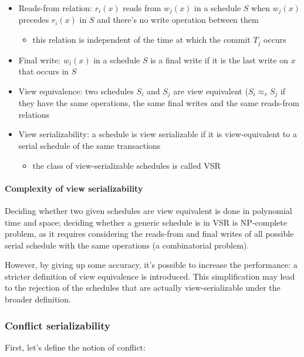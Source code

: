 \documentclass[english]{article}
\begin{document}
\begin{itemize}
  \item Reads-from relation: \(r_i(x)\) reads from \(w_j(x)\) in a schedule \(S\) when \(w_j(x)\) precedes \(r_i(x)\) in \(S\) and there's no write operation between them
        \begin{itemize}
          \item this relation is independent of the time at which the commit \(T_j\) occurs
        \end{itemize}
  \item Final write: \(w_i(x)\) in a schedule \(S\) is a final write if it is the last write on \(x\) that occurs in \(S\)
  \item View equivalence: two schedules \(S_i\) and \(S_j\) are view equivalent (\(S_i \approx_v S_j\) if they have the same operations, the same final writes and the same reads-from relations
  \item View serializability: a schedule is view serializable if it is view-equivalent to a serial schedule of the same transactions
        \begin{itemize}
          \item the class of view-serializable schedules is called VSR
        \end{itemize}
\end{itemize}

\paragraph{Complexity of view serializability}

Deciding whether two given schedules are view equivalent is done in polynomial time and space;
deciding whether a generic schedule is in VSR is NP-complete problem, as it requires considering the reads-from and final writes of all possible serial schedule with the same operations (a combinatorial problem).

However, by giving up some accuracy, it's possible to increase the performance: a stricter definition of view equivalence is introduced.
This simplification may lead to the rejection of the schedules that are actually view-serializable under the broader definition.

\subsubsection{Conflict serializability}

First, let's define the notion of conflict:
\end{document}
